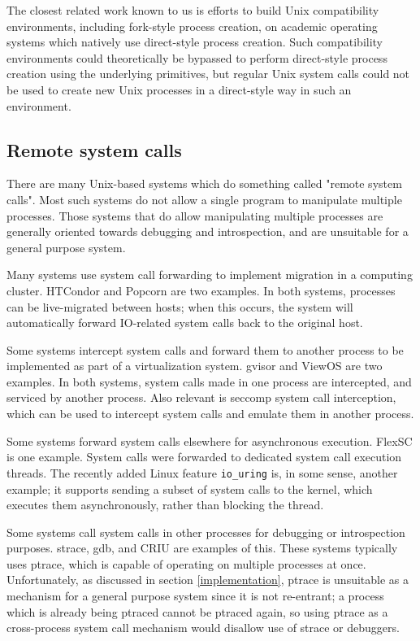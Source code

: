 \documentclass[letterpaper,twocolumn,10pt]{article}
\begin{document}
The closest related work known to us
is efforts to build Unix compatibility environments, including fork-style process creation,
on academic operating systems which natively use direct-style process creation.\cite{exokernel}
Such compatibility environments could theoretically be bypassed to perform direct-style process creation
using the underlying primitives,
but regular Unix system calls could not be used to create new Unix processes in a direct-style way
in such an environment.
\subsection{Remote system calls}
There are many Unix-based systems which do something called "remote system calls".
Most such systems do not allow a single program to manipulate multiple processes.
Those systems that do allow manipulating multiple processes
are generally oriented towards debugging and introspection,
and are unsuitable for a general purpose system.

Many systems use system call forwarding to implement migration in a computing cluster.
HTCondor\cite{condor} and Popcorn\cite{popcorn} are two examples.
In both systems, processes can be live-migrated between hosts;
when this occurs, the system will automatically forward IO-related system calls
back to the original host.

Some systems intercept system calls and forward them to another process to be implemented
as part of a virtualization system.
gvisor\cite{gvisor} and ViewOS\cite{viewos} are two examples.
In both systems,
system calls made in one process are intercepted,
and serviced by another process.
Also relevant is seccomp system call interception,
which can be used to intercept system calls and emulate them in another process.

Some systems forward system calls elsewhere for asynchronous execution.
FlexSC\cite{flexsc} is one example.
System calls were forwarded to dedicated system call execution threads.
The recently added Linux feature \verb|io_uring| is, in some sense, another example;
it supports sending a subset of system calls to the kernel,
which executes them asynchronously,
rather than blocking the thread.

Some systems call system calls in other processes for debugging or introspection purposes.
strace, gdb, and CRIU\cite{criu} are examples of this.
These systems typically uses ptrace,
which is capable of operating on multiple processes at once.
Unfortunately, as discussed in section \ref{implementation},
ptrace is unsuitable as a mechanism for a general purpose system since it is not re-entrant;
a process which is already being ptraced cannot be ptraced again,
so using ptrace as a cross-process system call mechanism would disallow use of strace or debuggers.
\end{document}
